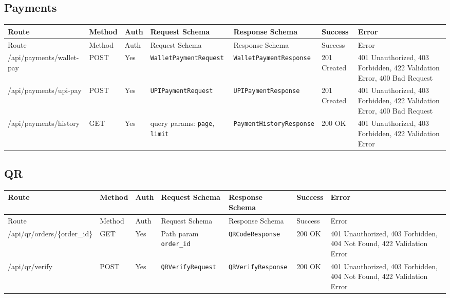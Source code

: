 \subsection{Payments}
\begin{longtable}{p{3.2cm} p{1.7cm} p{2.2cm} p{3.6cm} p{3.6cm} p{1.8cm} p{1.8cm}}
\toprule
Route & Method & Auth & Request Schema & Response Schema & Success & Error \\
\midrule
\endfirsthead
\toprule
Route & Method & Auth & Request Schema & Response Schema & Success & Error \\
\midrule
\endhead
\bottomrule
\endfoot

/api/payments/wallet-pay & POST & Yes & \texttt{WalletPaymentRequest} & \texttt{WalletPaymentResponse} & 201 Created & 401 Unauthorized, 403 Forbidden, 422 Validation Error, 400 Bad Request \\

/api/payments/upi-pay & POST & Yes & \texttt{UPIPaymentRequest} & \texttt{UPIPaymentResponse} & 201 Created & 401 Unauthorized, 403 Forbidden, 422 Validation Error, 400 Bad Request \\

/api/payments/history & GET & Yes & query params: \texttt{page}, \texttt{limit} & \texttt{PaymentHistoryResponse} & 200 OK & 401 Unauthorized, 403 Forbidden, 422 Validation Error \\
\end{longtable}

\subsection{QR}
\begin{longtable}{p{3.2cm} p{1.7cm} p{2.2cm} p{3.6cm} p{3.6cm} p{1.8cm} p{1.8cm}}
\toprule
Route & Method & Auth & Request Schema & Response Schema & Success & Error \\
\midrule
\endfirsthead
\toprule
Route & Method & Auth & Request Schema & Response Schema & Success & Error \\
\midrule
\endhead
\bottomrule
\endfoot

/api/qr/orders/\{order\_id\} & GET & Yes & Path param \texttt{order\_id} & \texttt{QRCodeResponse} & 200 OK & 401 Unauthorized, 403 Forbidden, 404 Not Found, 422 Validation Error \\

/api/qr/verify & POST & Yes & \texttt{QRVerifyRequest} & \texttt{QRVerifyResponse} & 200 OK & 401 Unauthorized, 403 Forbidden, 404 Not Found, 422 Validation Error \\
\end{longtable}


